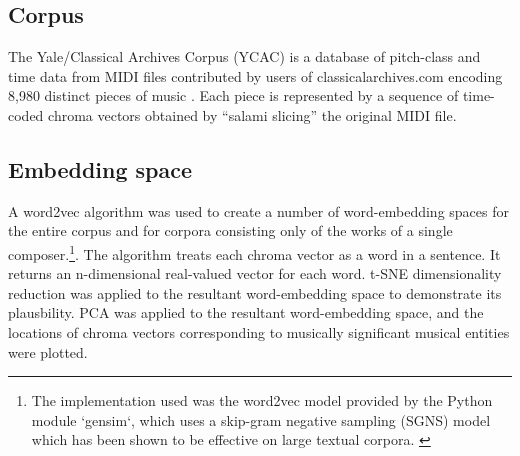 \subsection{Corpus}\label{corpus}

The Yale/Classical Archives Corpus (YCAC) is a database of pitch-class
and time data from MIDI files contributed by users of
classicalarchives.com encoding 8,980 distinct pieces of music
\cite{white2014yale}. Each piece is represented by a sequence of
time-coded chroma vectors obtained by ``salami slicing'' the original
MIDI file.

\subsection{Embedding space}\label{embedding-space}

A word2vec algorithm was used to create a number of word-embedding
spaces for the entire corpus and for corpora consisting only of the
works of a single
composer.\footnote{The implementation used was the word2vec model provided by the Python module `gensim`, which uses a skip-gram negative sampling (SGNS) model which has been shown to be effective on large textual corpora. \cite{rehurek_lrec}}.
The algorithm treats each chroma vector as a word in a sentence. It
returns an n-dimensional real-valued vector for each word. t-SNE
dimensionality reduction was applied to the resultant word-embedding
space to demonstrate its plausbility. PCA was applied to the resultant
word-embedding space, and the locations of chroma vectors corresponding
to musically significant musical entities were plotted.
